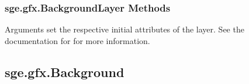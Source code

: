 \documentclass[letterpaper,10pt,english]{sphinxmanual}
\begin{document}
\subsubsection{sge.gfx.BackgroundLayer Methods}
\label{gfx:sge-gfx-backgroundlayer-methods}

\begin{fulllineitems}
\label{gfx:sge.gfx.BackgroundLayer.__init__}
Arguments set the respective initial attributes of the layer.
See the documentation for {\hyperref[gfx:sge.gfx.BackgroundLayer]{\emph{}}} for
more information.

\end{fulllineitems}



\subsection{sge.gfx.Background}
\label{gfx:sge-gfx-background}
\end{document}
